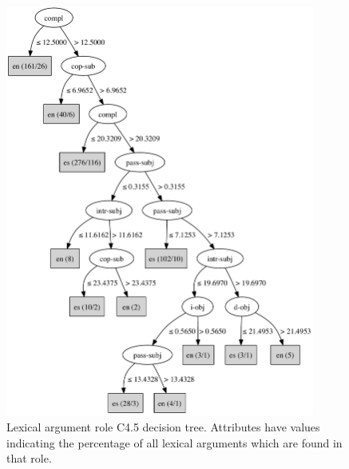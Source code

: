 \documentclass[main.tex]{subfiles}
\begin{document}
\begin{figure}[ht]
\centering
\caption{Lexical argument role C4.5 decision tree. Attributes have values indicating the percentage of all lexical arguments which are found in that role.}
\label{fig:c4.5-lex-role}
\includegraphics[width=4in]{c45-lex-role.pdf}
\end{figure}

\biblio
\end{document}
